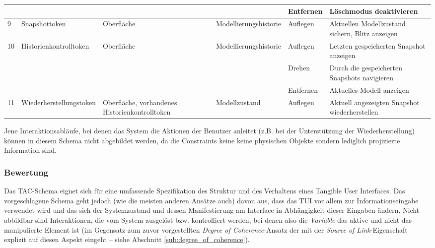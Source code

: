 \begin{longtable}{| p{} || p{} | p{2cm} || p{2cm} | p{2cm} | p{3cm} |}
		 				   &    	& 			 &  & Entfernen & Löschmodus deaktivieren \\ \hline
		9 & Snapshot\-token & Oberfläche & Modell\-ierungs\-historie & Auflegen & Aktuellen Modellzustand sichern, Blitz anzeigen \\ \hline
		\multirow{3}{*}{10} & Historien\-kontroll\-token & Oberfläche & Modell\-ierungs\-historie  & Auflegen & Letzten gespeicherten Snapshot anzeigen \\ \cline{5-6}
						   &   &			 &  & Drehen & Durch die gespeicherten Snapshots navigieren \\ \cline{5-6}
						   &   &			 &  & Entfernen & Aktuelles Modell anzeigen \\ \hline
		11 & Wieder\-herstellungs\-token & Oberfläche, vorhandenes Historien\-kontroll\-token & Modell\-zustand & Auflegen & Aktuell angezeigten Snapshot wiederherstellen \\ \hline

	\end{longtable}

Jene Interaktionsabläufe, bei denen das System die Aktionen der Benutzer anleitet (z.B. bei der Unterstützung der Wiederherstellung) können in diesem Schema nicht abgebildet werden, da die Constraints keine keine physischen Objekte sondern lediglich projizierte Information sind.

\subsubsection{Bewertung}

Das \gls{TAC}-Schema eignet sich für eine umfassende Spezifikation des Struktur und des Verhaltens eines Tangible User Interfaces. Das vorgeschlagene Schema geht jedoch (wie die meisten anderen Ansätze auch) davon aus, dass das \gls{TUI} vor allem zur Informationseingabe verwendet wird und das sich der Systemzustand und dessen Manifestierung am Interface in Abhängigkeit dieser Eingaben ändern. Nicht abbildbar sind Interaktionen, die vom System ausgelöst bzw. kontrolliert werden, bei denen also die \emph{Variable} das aktive und nicht das manipulierte Element ist (im Gegensatz zum zuvor vorgestellten \emph{Degree of Coherence}-Ansatz der mit der \emph{Source of Link}-Eigenschaft explizit auf diesen Aspekt eingeht -- siehe Abschnitt \ref{sub:degree_of_coherence}).

